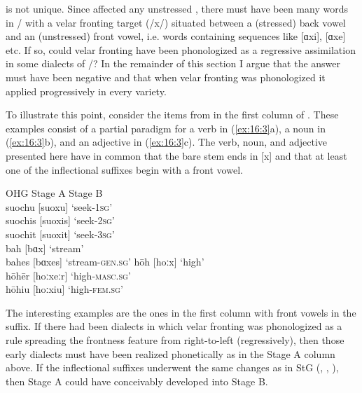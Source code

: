  is not unique. Since  affected any unstressed , there must have been many words in / with a velar fronting target (/x/) situated between a (stressed) back vowel and an (unstressed) front vowel, i.e. words containing sequences like [ɑxi], [ɑxe] etc. If so, could velar fronting have been phonologized as a regressive assimilation in some dialects of /? In the remainder of this section I argue that the answer must have been negative and that when velar fronting was phonologized it applied progressively in every variety.

To illustrate this point, consider the items from  in the first column of . These  examples consist of a partial paradigm for a verb in (\ref{ex:16:3}a), a noun in (\ref{ex:16:3}b), and an adjective in (\ref{ex:16:3}c). The verb, noun, and adjective presented here have in common that the bare stem ends in [x] and that at least one of the inflectional suffixes begin with a front vowel.

\ea%
    \label{ex:16:3}
\begin{xlist}
\sn{}    OHG \tab Stage A \tab Stage B\\
\ex suochu [suoxu] \tab [suoxu] \tab [zuːxə] \tab ‘seek\textsc{{}-1sg}’\\
    suochis [suoxis] \tab [suoçis] \tab [zuːçst] \tab  ‘seek\textsc{{}-2sg}’\\
    suochit [suoxit] \tab [suoçit] \tab [zuːçt] \tab ‘seek\textsc{{}-3sg}’\\
\ex bah [bɑx] \tab [bɑx] \tab [bɑx] \tab ‘stream’\\
    bahes [bɑxes] \tab [bɑçes] \tab [bɑçəs] \tab ‘stream\textsc{{}-gen.sg}’
\ex hōh [hoːx] \tab [hoːx] \tab [hoːx] \tab ‘high’\\
    hōhēr [hoːxeːr] \tab [hoːçeːr] \tab [hoːçɐ] \tab ‘high\textsc{{}-masc.sg}’\\
    hōhiu [hoːxiu] \tab [hoːçiu] \tab [hoːçə] \tab ‘high\textsc{{}-fem.sg}’
\end{xlist}
\z 

The interesting examples are the ones in the first column with front vowels in the suffix. If there had been  dialects in which velar fronting was phonologized as a rule spreading the frontness feature from right-to-left (regressively), then those early dialects must have been realized phonetically as in the Stage A column above. If the inflectional suffixes underwent the same changes as in StG (, , ), then Stage A could have conceivably developed into Stage B.

